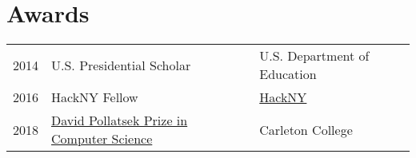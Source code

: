 \documentclass{resume}
\begin{document}
\begin{minipage}[t]{0.66\textwidth}

\section{Awards}
\begin{tabular}{rll}
  2014 & U.S. Presidential Scholar & U.S. Department of Education \\
  2016 & HackNY Fellow & \href{https://apply.hackny.org}{HackNY} \\
  2018 & \href{https://apps.carleton.edu/curricular/cs/major/awards/pollatsek/}{David Pollatsek Prize in Computer Science} & Carleton College \\
\end{tabular}
\sectionsep

\end{minipage}
\end{document}
